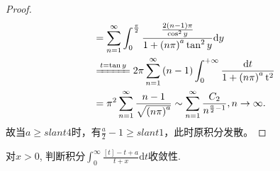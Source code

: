 \documentclass[../../main.tex]{subfiles}
\begin{document}
\begin{proof}
\begin{align*}
&=\sum_{n=1}^{\infty}{\int_0^{\frac{\pi}{2}}{\frac{\frac{2\left( n-1 \right) \pi}{\cos ^2y}}{1+\left( n\pi \right) ^a\tan ^2y}\mathrm{d}y}}\\
&\xlongequal{t=\tan y}2\pi \sum_{n=1}^{\infty}{\left( n-1 \right) \int_0^{+\infty}{\frac{\mathrm{d}t}{1+\left( n\pi \right) ^a\mathrm{t}^2}}}\\
&=\pi ^2\sum_{n=1}^{\infty}{\frac{n-1}{\sqrt{\left( n\pi \right) ^a}}}\sim \sum_{n=1}^{\infty}{\frac{C_2}{n^{\frac{a}{2}-1}}},n\rightarrow \infty .
\end{align*}
故当$a\geqslant slant 4$时，有$\frac{a}{2}-1\geqslant slant 1$，此时原积分发散。
\end{proof}

\begin{example}
对$x > 0$, 判断积分$\int_0^{\infty} \frac{[t] - t + a}{t + x} \mathrm{d}t$收敛性.
\end{example}
\end{document}
